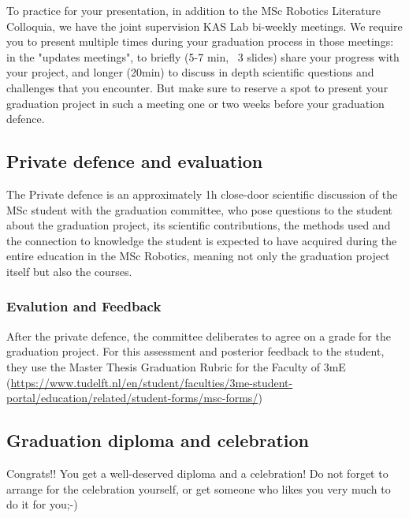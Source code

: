 To practice for your presentation, in addition to the MSc Robotics Literature Colloquia, we have the joint supervision KAS Lab bi-weekly meetings.
We require you to present multiple times during your graduation process in those meetings: in the "updates meetings", to briefly (5-7 min, ~3 slides) share your progress with your project, and longer (20min) to discuss in depth scientific questions and challenges that you encounter.
But make sure to reserve a spot to present your graduation project in such a meeting one or two weeks before your graduation defence.

\subsection{Private defence and evaluation}
The Private defence is an approximately 1h close-door scientific discussion of the MSc student with the graduation committee, who pose questions to the student about the graduation project, its scientific contributions, the methods used and the connection to knowledge the student is expected to have acquired during the entire education in the MSc Robotics, meaning not only the graduation project itself but also the courses.

\subsubsection{Evalution and Feedback}
After the private defence, the committee deliberates to agree on a grade for the graduation project. For this assessment and posterior feedback to the student, they use the Master Thesis Graduation Rubric for the Faculty of 3mE (\href{link to forms}{https://www.tudelft.nl/en/student/faculties/3me-student-portal/education/related/student-forms/msc-forms/})

\subsection{Graduation diploma and celebration}
Congrats!!
You get a well-deserved diploma and a celebration! Do not forget to arrange for the celebration yourself, or get someone who likes you very much to do it for you;-)